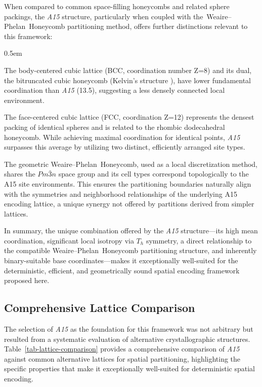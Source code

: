 \documentclass[10pt]{article}
\def\AAAB{\textit{A15}}
\def\WP{Weaire--Phelan}
\def\WPH{\WP{}~Honeycomb}
\def\tWPH{the~\WP{}~Honeycomb}
\begin{document}
When compared to common space-filling honeycombs and related sphere packings, the \AAAB{} structure, particularly when coupled with \tWPH{} partitioning method, offers further distinctions relevant to this framework:
\begin{description} \itemsep0.5em
    \item[vs. BCC-derived Structures:] The body-centered cubic lattice (BCC, coordination number Z=8) and its dual, the bitruncated cubic honeycomb (Kelvin's structure \cite{Kelvin1887}), have lower fundamental coordination than \AAAB{} (13.5), suggesting a less densely connected local environment.
    \item[vs. FCC-derived Structures:] The face-centered cubic lattice (FCC, coordination Z=12) represents the densest packing of identical spheres \cite{ConwaySloane1999} and is related to the rhombic dodecahedral honeycomb. While achieving maximal coordination for identical points, \AAAB{} surpasses this average by utilizing two distinct, efficiently arranged site types.
    \item[vs. \tWPH{}:] The geometric \WPH{}, used as a local discretization method, shares the $Pm\bar{3}n$ space group and its cell types correspond topologically to the A15 site environments. This ensures the partitioning boundaries naturally align with the symmetries and neighborhood relationships of the underlying A15 encoding lattice, a unique synergy not offered by partitions derived from simpler lattices.
\end{description}
In summary, the unique combination offered by the \AAAB{} structure—its high mean coordination, significant local isotropy via $T_h$ symmetry, a direct relationship to the compatible \WPH{} partitioning structure, and inherently binary-suitable base coordinates—makes it exceptionally well-suited for the deterministic, efficient, and geometrically sound spatial encoding framework proposed here.

\subsection{Comprehensive Lattice Comparison}
\label{subsec-comparison-comprehensive}

The selection of \AAAB{} as the foundation for this framework was not arbitrary but resulted from a systematic evaluation of alternative crystallographic structures. Table~\ref{tab-lattice-comparison} provides a comprehensive comparison of \AAAB{} against common alternative lattices for spatial partitioning, highlighting the specific properties that make it exceptionally well-suited for deterministic spatial encoding.
\end{document}

